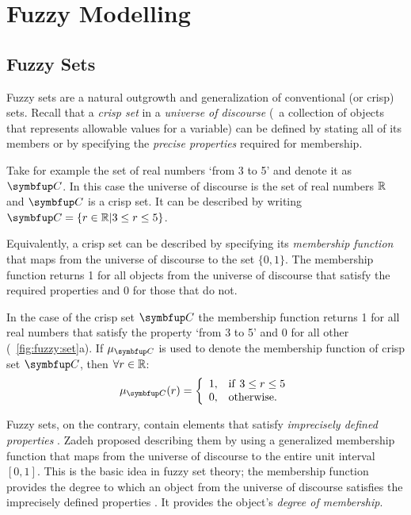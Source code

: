 









\chapter{Fuzzy Modelling}
\label{ch:fuzzyModelling}


\section{Fuzzy Sets}
\label{sec:fuzzyModelling:fuzzySets}
Fuzzy sets are a natural outgrowth and generalization of conventional (or crisp) sets. Recall that a \emph{crisp set} in a \emph{universe of discourse} (\ie\ a collection of objects that represents allowable values for a variable) can be defined by stating all of its members or by specifying the \emph{precise properties} required for membership. 

Take for example the set of real numbers `from 3 to 5' and denote it as $\set{C}$. In this case the universe of discourse is the set of real numbers $\mathbb{R}$ and $\set{C}$ is a crisp set. It can be described by writing $\set{C}=\{r \in \R| 3 \leq r \leq 5\}$. 

Equivalently, a crisp set can be described by specifying its \emph{membership function} that maps from the universe of discourse to the set $\{0,1\}$. The membership function returns 1 for all objects from the universe of discourse that satisfy the required properties and 0 for those that do not. 

In the case of the crisp set $\set{C}$ the membership function returns 1 for all real numbers that satisfy the property `from 3 to 5' and 0 for all other (\fig~\ref{fig:fuzzy:set}a). If $\mu_\set{C}$ is used to denote the membership function of crisp set $\set{C}$, then $\forall r \in \mathbb{R}$:
%
\begin{equation}
	\mu_\set{C}(r)=\left\{
	 \begin{array}{ll}
	   1, & \mathrm{if\ }3 \leq r \leq 5 \\
	   0, & \mathrm{otherwise}.
	 \end{array}
	\right.
\end{equation}

Fuzzy sets, on the contrary, contain elements that satisfy \emph{imprecisely defined properties} \cite{bezdek:1992}. Zadeh \cite{zadeh:1965} proposed describing them by using a generalized membership function that maps from the universe of discourse to the entire unit interval $[0,1]$. This is the basic idea in fuzzy set theory; the membership function provides the degree to which an object from the universe of discourse satisfies the imprecisely defined properties \cite{bezdek:1992}. It provides the object's \emph{degree of membership}. 


